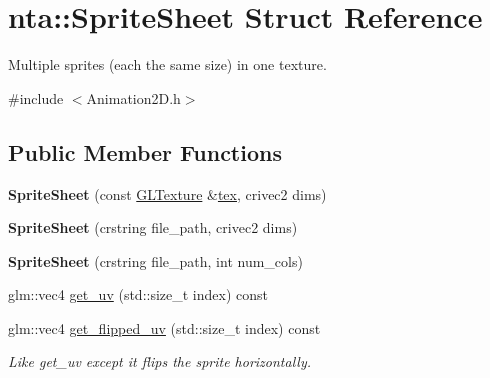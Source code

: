 \hypertarget{structnta_1_1SpriteSheet}{}\section{nta\+:\+:Sprite\+Sheet Struct Reference}
\label{structnta_1_1SpriteSheet}


Multiple sprites (each the same size) in one texture.  




{\ttfamily \#include $<$Animation2\+D.\+h$>$}

\subsection*{Public Member Functions}
\begin{DoxyCompactItemize}
\item 
\mbox{\label{structnta_1_1SpriteSheet_acb0a6cab5e60d26a8e00d1e78974456b}} 
{\bfseries Sprite\+Sheet} (const \hyperlink{structnta_1_1GLTexture}{G\+L\+Texture} \&\hyperlink{structnta_1_1SpriteSheet_a6c55217abab2dbd76b61ad92fe902367}{tex}, crivec2 dims)
\item 
\mbox{\label{structnta_1_1SpriteSheet_aca9119d89a8c2c9e8e88cc43844c264a}} 
{\bfseries Sprite\+Sheet} (crstring file\+\_\+path, crivec2 dims)
\item 
\mbox{\label{structnta_1_1SpriteSheet_a68232c976caa805754f7b3863129ee09}} 
{\bfseries Sprite\+Sheet} (crstring file\+\_\+path, int num\+\_\+cols)
\item 
glm\+::vec4 \hyperlink{structnta_1_1SpriteSheet_a618bc48e6978a19ad9eb56dda3307f5a}{get\+\_\+uv} (std\+::size\+\_\+t index) const
\item 
\mbox{\label{structnta_1_1SpriteSheet_a98643a92390617ac5575b7a951e9805a}} 
glm\+::vec4 \hyperlink{structnta_1_1SpriteSheet_a98643a92390617ac5575b7a951e9805a}{get\+\_\+flipped\+\_\+uv} (std\+::size\+\_\+t index) const
\begin{DoxyCompactList}\small\item\em Like get\+\_\+uv except it flips the sprite horizontally. \end{DoxyCompactList}\end{DoxyCompactItemize}
